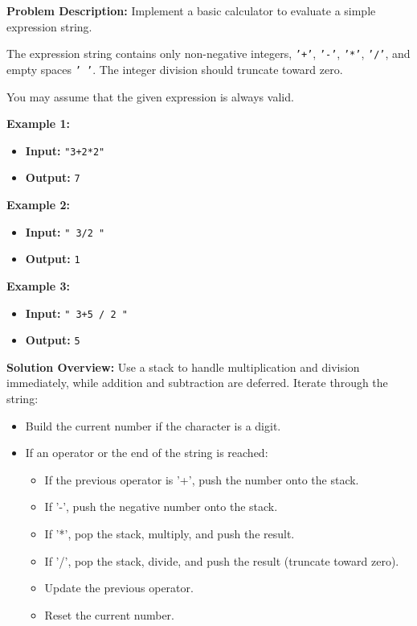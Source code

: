 

\textbf{Problem Description:}  
Implement a basic calculator to evaluate a simple expression string.

The expression string contains only non-negative integers, \texttt{'+'}, \texttt{'-'}, \texttt{'*'}, \texttt{'/'}, and empty spaces \texttt{' '}. The integer division should truncate toward zero.

You may assume that the given expression is always valid.

\textbf{Example 1:}

\begin{itemize}
    \item \textbf{Input:} \texttt{"3+2*2"}
    \item \textbf{Output:} \texttt{7}
\end{itemize}

\textbf{Example 2:}

\begin{itemize}
    \item \textbf{Input:} \texttt{" 3/2 "}
    \item \textbf{Output:} \texttt{1}
\end{itemize}

\textbf{Example 3:}

\begin{itemize}
    \item \textbf{Input:} \texttt{" 3+5 / 2 "}
    \item \textbf{Output:} \texttt{5}
\end{itemize}

\textbf{Solution Overview:}  
Use a stack to handle multiplication and division immediately, while addition and subtraction are deferred. Iterate through the string:

\begin{itemize}
    \item Build the current number if the character is a digit.
    \item If an operator or the end of the string is reached:
        \begin{itemize}
            \item If the previous operator is '+', push the number onto the stack.
            \item If '-', push the negative number onto the stack.
            \item If '*', pop the stack, multiply, and push the result.
            \item If '/', pop the stack, divide, and push the result (truncate toward zero).
            \item Update the previous operator.
            \item Reset the current number.
        \end{itemize}
\end{itemize}

